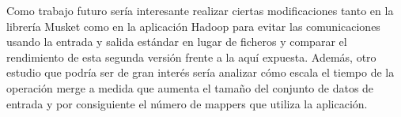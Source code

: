 \documentclass[conference]{IEEEtran}
\begin{document}
Como trabajo futuro sería interesante realizar ciertas modificaciones tanto en la librería Musket como en la aplicación Hadoop para evitar las comunicaciones usando la entrada y salida estándar en lugar de ficheros y comparar el rendimiento de esta segunda versión frente a la aquí expuesta. Además, otro estudio que podría ser de gran interés sería analizar cómo escala el tiempo de la operación merge a medida que aumenta el tamaño del conjunto de datos de entrada y por consiguiente el número de mappers que utiliza la aplicación.




\end{document}
